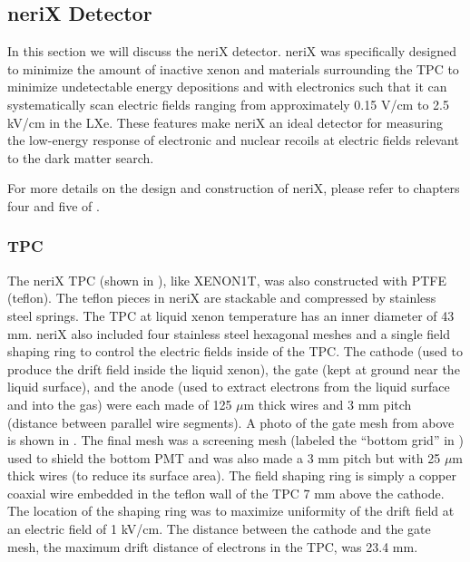 \subsection{neriX Detector}

In this section we will discuss the neriX detector.  neriX was specifically designed to minimize the amount of inactive xenon and materials surrounding the TPC to minimize undetectable energy depositions and with electronics such that it can systematically scan electric fields ranging from approximately 0.15 V/cm to 2.5 kV/cm in the LXe.  These features make neriX an ideal detector for measuring the low-energy response of electronic and nuclear recoils at electric fields relevant to the dark matter search.

For more details on the design and construction of neriX, please refer to chapters four and five of .

\subsubsection{TPC}

The neriX TPC (shown in ), like XENON1T, was also constructed with PTFE (teflon).  The teflon pieces in neriX are stackable and compressed by stainless steel springs.  The TPC at liquid xenon temperature has an inner diameter of 43 mm.  neriX also included four stainless steel hexagonal meshes and a single field shaping ring to control the electric fields inside of the TPC.  The cathode (used to produce the drift field inside the liquid xenon), the gate (kept at ground near the liquid surface), and the anode (used to extract electrons from the liquid surface and into the gas) were each made of  125 $\mu$m thick wires and 3 mm pitch (distance between parallel wire segments).  A photo of the gate mesh from above is shown in .  The final mesh was a screening mesh (labeled the ``bottom grid'' in ) used to shield the bottom PMT and was also made a 3 mm pitch but with 25 $\mu$m thick wires (to reduce its surface area).  The field shaping ring is simply a copper coaxial wire embedded in the teflon wall of the TPC 7 mm above the cathode.  The location of the shaping ring was to maximize uniformity of the drift field at an electric field of 1 kV/cm.  The distance between the cathode and the gate mesh, the maximum drift distance of electrons in the TPC, was 23.4 mm.


